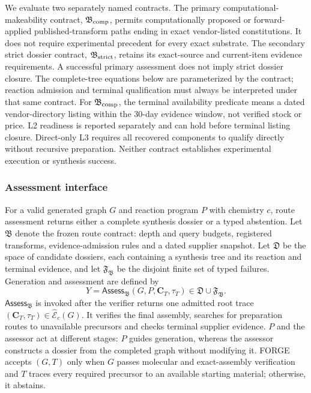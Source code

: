 We evaluate two separately named contracts. The primary computational-makeability contract,
$\mathfrak B_{\rm comp}$, permits computationally proposed or forward-applied published-transform
paths ending in exact vendor-listed constitutions. It does not require experimental precedent for
every exact substrate. The secondary strict dossier contract, $\mathfrak B_{\rm strict}$, retains
its exact-source and current-item evidence requirements. A successful primary assessment does not
imply strict dossier closure. The complete-tree equations below are parameterized by the contract;
reaction admission and terminal qualification must always be interpreted under that same contract.
For $\mathfrak B_{\rm comp}$, the terminal availability predicate means a dated vendor-directory
listing within the 30-day evidence window, not verified stock or price. L2 readiness is reported
separately and can hold before terminal listing closure. Direct-only L3 requires all recovered
components to qualify directly without recursive preparation. Neither contract establishes
experimental execution or synthesis success.

\subsubsection{Assessment interface}

For a valid generated graph $G$ and reaction program $P$ with chemistry $c$, route assessment
returns either a
complete synthesis dossier or a typed abstention.
Let $\mathfrak B$ denote the frozen route contract: depth and query budgets, registered transforms,
evidence-admission rules and a dated supplier snapshot. Let $\mathfrak D$ be the space of candidate
dossiers, each containing a synthesis tree and its reaction and terminal evidence, and let
$\mathfrak F_{\mathfrak B}$ be the disjoint finite set of typed failures.
Generation and assessment are defined by
\begin{equation}
    Y=\mathsf{Assess}_{\mathfrak B}(G,P,\mathbf C_T,\tau_T)
    \in\mathfrak D\cup\mathfrak F_{\mathfrak B}.
\end{equation}
$\mathsf{Assess}_{\mathfrak B}$ is invoked after the verifier returns one admitted root trace
$(\mathbf C_T,\tau_T)\in\widehat{\mathcal E}_c(G)$. It verifies the final assembly, searches for
preparation routes to unavailable precursors and checks terminal supplier evidence. $P$ and the assessor act at different stages: $P$ guides generation, whereas the assessor
constructs a dossier from the completed graph without modifying it.
FORGE accepts $(G,T)$ only when $G$ passes molecular and exact-assembly verification and $T$ traces
every required precursor to an available starting material; otherwise, it abstains.

